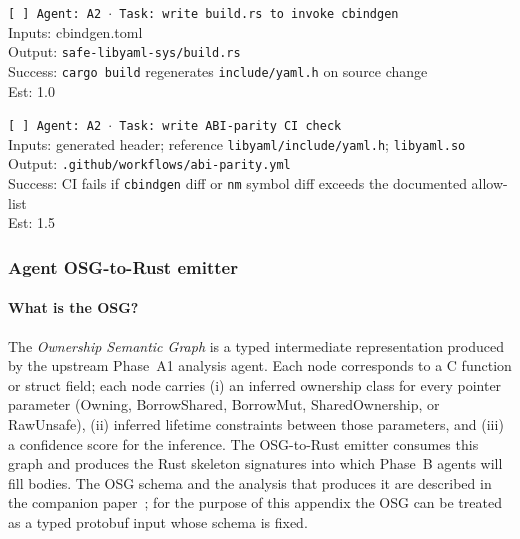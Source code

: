 \documentclass[12pt]{article}
\theoremstyle{definition}
\theoremstyle{remark}
\begin{document}
\begin{small}
\noindent\texttt{[ ] Agent: A2 $\cdot$ Task: write build.rs to invoke cbindgen}\\
\hspace*{2em}Inputs: cbindgen.toml\\
\hspace*{2em}Output: \texttt{safe-libyaml-sys/build.rs}\\
\hspace*{2em}Success: \texttt{cargo build} regenerates \texttt{include/yaml.h} on source change\\
\hspace*{2em}Est: 1.0

\noindent\texttt{[ ] Agent: A2 $\cdot$ Task: write ABI-parity CI check}\\
\hspace*{2em}Inputs: generated header; reference \texttt{libyaml/include/yaml.h}; \texttt{libyaml.so}\\
\hspace*{2em}Output: \texttt{.github/workflows/abi-parity.yml}\\
\hspace*{2em}Success: CI fails if \texttt{cbindgen} diff or \texttt{nm} symbol diff exceeds the documented allow-list\\
\hspace*{2em}Est: 1.5
\end{small}

\subsubsection{Agent OSG-to-Rust emitter}

\paragraph{What is the OSG?} The \emph{Ownership Semantic Graph} is a typed
intermediate representation produced by the upstream Phase~A1 analysis
agent. Each node corresponds to a C function or struct field; each node
carries (i) an inferred ownership class for every pointer parameter
(\textsf{Owning}, \textsf{BorrowShared}, \textsf{BorrowMut},
\textsf{SharedOwnership}, or \textsf{RawUnsafe}), (ii) inferred lifetime
constraints between those parameters, and (iii) a confidence score for the
inference. The OSG-to-Rust emitter consumes this graph and produces the
Rust skeleton signatures into which Phase~B agents will fill bodies.
The OSG schema and the analysis that produces it are described in the
companion paper~\cite{long-c}; for the purpose of this appendix the OSG
can be treated as a typed protobuf input whose schema is fixed.
\end{document}
